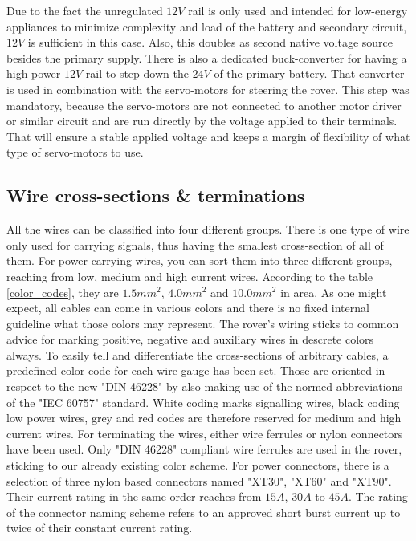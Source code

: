     Due to the fact the unregulated $12V$ rail is only used and intended for low-energy appliances to minimize complexity and load of the battery and secondary circuit, $12V$ is sufficient in this case. Also, this doubles as second native voltage source besides the primary supply. There is also a dedicated buck-converter for having a high power $12V$ rail to step down the $24V$ of the primary battery. That converter is used in combination with the servo-motors for steering the rover. This step was mandatory, because the servo-motors are not connected to another motor driver or similar circuit and are run directly by the voltage applied to their terminals. That will ensure a stable applied voltage and keeps a margin of flexibility of what type of servo-motors to use. 

    \clearpage

    \subsection{Wire cross-sections \& terminations}

    All the wires can be classified into four different groups. There is one type of wire only used for carrying signals, thus having the smallest cross-section of all of them. For power-carrying wires, you can sort them into three different groups, reaching from low, medium and high current wires. According to the table \ref{color_codes}, they are $1.5mm^2$, $4.0mm^2$ and $10.0mm^2$ in area. As one might expect, all cables can come in various colors and there is no fixed internal guideline what those colors may represent. The rover's wiring sticks to common advice for marking positive, negative and auxiliary wires in descrete colors always. To easily tell and differentiate the cross-sections of arbitrary cables, a predefined color-code for each wire gauge has been set. Those are oriented in respect to the new "DIN 46228" by also making use of the normed abbreviations of the "IEC 60757" standard. White coding marks signalling wires, black coding low power wires, grey and red codes are therefore reserved for medium and high current wires. For terminating the wires, either wire ferrules or nylon connectors have been used. Only "DIN 46228" compliant wire ferrules are used in the rover, sticking to our already existing color scheme. For power connectors, there is a selection of three nylon based connectors named "XT30", "XT60" and "XT90". Their current rating in the same order reaches from $15A$, $30A$ to $45A$. The rating of the connector naming scheme refers to an approved short burst current up to twice of their constant current rating.  
    
